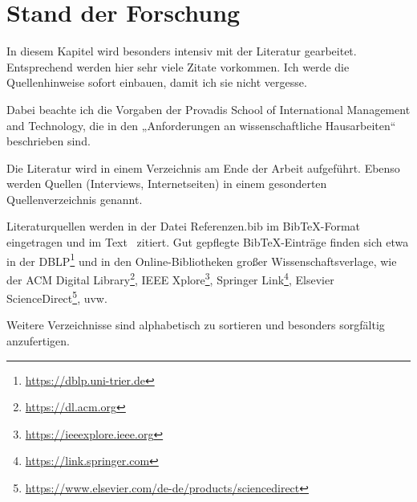 %

\chapter{Stand der Forschung}

In diesem Kapitel wird besonders intensiv mit der Literatur gearbeitet. Entsprechend werden hier sehr viele Zitate vorkommen. Ich werde die Quellenhinweise sofort einbauen, damit ich sie nicht vergesse.

Dabei beachte ich die Vorgaben der Provadis School of International Management and Technology, die in den „Anforderungen an wissenschaftliche Hausarbeiten“ beschrieben sind.

Die Literatur wird in einem Verzeichnis am Ende der Arbeit aufgeführt.
Ebenso werden Quellen (Interviews, Internetseiten) in einem gesonderten Quellenverzeichnis genannt.

Literaturquellen werden in der Datei Referenzen.bib im BibTeX-Format eingetragen und im Text~\cite{lustigeCitation} zitiert. Gut gepflegte BibTeX-Einträge finden sich etwa in der DBLP\footnote{\url{https://dblp.uni-trier.de}} und in den Online-Bibliotheken großer Wissenschaftsverlage, wie der ACM Digital Library\footnote{\url{https://dl.acm.org}}, IEEE Xplore\footnote{\url{https://ieeexplore.ieee.org}}, Springer Link\footnote{\url{https://link.springer.com}}, Elsevier ScienceDirect\footnote{\url{https://www.elsevier.com/de-de/products/sciencedirect}}, uvw.

Weitere Verzeichnisse sind alphabetisch zu sortieren und besonders sorgfältig anzufertigen.
